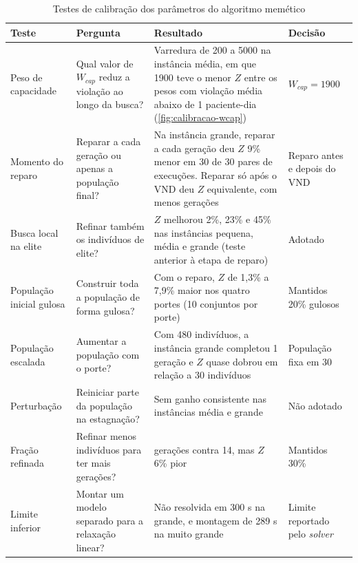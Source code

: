 \begin{table}[htbp]
    \centering
    \caption{Testes de calibração dos parâmetros do algoritmo memético}
    \label{tab:calibracao}
    \small
    \begin{tabularx}{\textwidth}{>{\raggedright\arraybackslash}p{2.3cm} >{\raggedright\arraybackslash}p{3.3cm} >{\raggedright\arraybackslash}X >{\raggedright\arraybackslash}p{2.8cm}}
        \hline
        \textbf{Teste} & \textbf{Pergunta} & \textbf{Resultado} & \textbf{Decisão} \\
        \hline
        Peso de capacidade & Qual valor de $W_{cap}$ reduz a violação ao longo da busca? & Varredura de 200 a 5000 na instância média, em que 1900 teve o menor $Z$ entre os pesos com violação média abaixo de 1 paciente-dia (\autoref{fig:calibracao-wcap}) & $W_{cap} = 1900$ \\
        \hline
        Momento do reparo & Reparar a cada geração ou apenas a população final? & Na instância grande, reparar a cada geração deu $Z$ 9\% menor em 30 de 30 pares de execuções. Reparar só após o VND deu $Z$ equivalente, com menos gerações & Reparo antes e depois do VND \\
        \hline
        Busca local na elite & Refinar também os indivíduos de elite? & $Z$ melhorou 2\%, 23\% e 45\% nas instâncias pequena, média e grande (teste anterior à etapa de reparo) & Adotado \\
        \hline
        População inicial gulosa & Construir toda a população de forma gulosa? & Com o reparo, $Z$ de 1,3\% a 7,9\% maior nos quatro portes (10 conjuntos por porte) & Mantidos 20\% gulosos \\
        \hline
        População escalada & Aumentar a população com o porte? & Com 480 indivíduos, a instância grande completou 1 geração e $Z$ quase dobrou em relação a 30 indivíduos & População fixa em 30 \\
        \hline
        Perturbação & Reiniciar parte da população na estagnação? & Sem ganho consistente nas instâncias média e grande & Não adotado \\
        \hline
        Fração refinada & Refinar menos indivíduos para ter mais gerações? & 23 gerações contra 14, mas $Z$ 6\% pior & Mantidos 30\% \\
        \hline
        Limite inferior & Montar um modelo separado para a relaxação linear? & Não resolvida em 300 s na grande, e montagem de 289 s na muito grande & Limite reportado pelo \textit{solver} \\
        \hline
    \end{tabularx}
\end{table}

